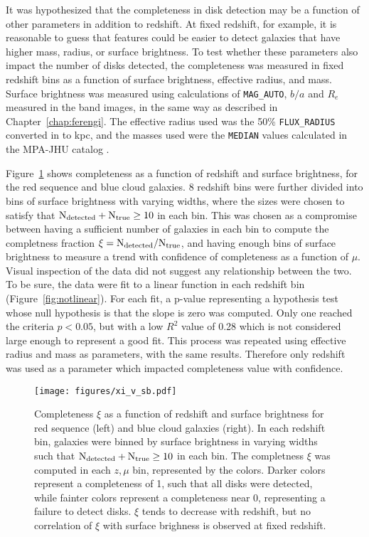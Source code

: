It was hypothesized that the completeness in disk detection may be a function of other parameters in addition to redshift. At fixed redshift, for example, it is reasonable to guess that features could be easier to detect galaxies that have higher mass, radius, or surface brightness. To test whether these parameters also impact the number of disks detected, the completeness was measured in fixed redshift bins as a function of surface brightness, effective radius, and mass. Surface brightness was measured using \sextractor{} calculations of {\tt MAG\_AUTO}, $b/a$ and $R_{e}$ measured in the \Iband{} band images, in the same way as described in Chapter~\ref{chap:ferengi}. The effective radius used was the 50\% {\tt FLUX\_RADIUS} converted in to kpc, and the masses used were the {\tt MEDIAN} values calculated in the MPA-JHU catalog \citep{Kauffmann2003b}.

Figure~\ref{fig:xi_v_sb} shows completeness as a function of redshift and surface brightness, for the red sequence and blue cloud galaxies. 8 redshift bins were further divided into bins of surface brightness with varying widths, where the sizes were chosen to satisfy that $\rm N_{detected} + N_{true} \ge 10$ in each bin. This was chosen as a compromise between having a sufficient number of galaxies in each bin to compute the completness fraction $\rm \xi = N_{detected}/N_{true}$, and having enough bins of surface brightness to measure a trend with confidence of completeness as a function of $\mu$. Visual inspection of the data did not suggest any relationship between the two. To be sure, the data were fit to a linear function in each redshift bin (Figure~\ref{fig:notlinear}). For each fit, a p-value representing a hypothesis test whose null hypothesis is that the slope is zero was computed. Only one reached the criteria $p<0.05$, but with a low $R^{2}$ value of 0.28 which is not considered large enough to represent a good fit. This process was repeated using effective radius and mass as parameters, with the same results. Therefore only redshift was used as a parameter which impacted completeness value with confidence.  


\begin{figure}
\centering
\texttt{[image: figures/xi\_v\_sb.pdf]}
\caption{Completeness $\xi$ as a function of redshift and surface brightness for red sequence (left) and blue cloud galaxies (right). In each redshift bin, galaxies were binned by surface brightness in varying widths such that $\rm N_{detected} + N_{true} \ge 10$ in each bin. The completness $\xi$ was computed in each $z,\mu$ bin, represented by the colors. Darker colors represent a completeness of 1, such that all disks were detected, while fainter colors represent a completeness near 0, representing a failure to detect disks. $\xi$ tends to decrease with redshift, but no correlation of $\xi$ with surface brighness is observed at fixed redshift.}
\label{fig:xi_v_sb}
\end{figure}

